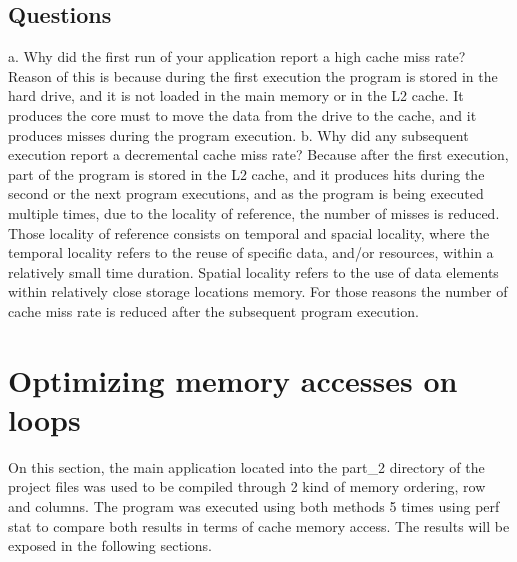 \documentclass[xcolor=table]{llncs}
\begin{document}
\subsection{Questions}
%
a. Why did the first run of your application report a high cache miss rate?\newline
Reason of this is because during the first execution the program is stored in the hard drive, and it is not loaded in the main memory or in the L2 cache.
It produces the core must to move the data from the drive to the cache, and it produces misses during the program execution.\newline\newline
b. Why did any subsequent execution report a decremental cache miss rate?\newline
Because after the first execution, part of the program is stored in the L2 cache, and it produces hits during the second or the next program executions, and as the program is being executed multiple times, due to the locality of reference, the number of misses is reduced.\newline
Those locality of reference consists on temporal and spacial locality, where the temporal locality refers to the reuse of specific data, and/or resources, within a relatively small time duration. Spatial locality refers to the use of data elements within relatively close storage locations memory.\newline
For those reasons the number of cache miss rate is reduced after the subsequent program execution.
\newline
%
\section{Optimizing memory accesses on loops}
%
On this section, the main application located into the part\_2 directory of the project files was used to be compiled through 2 kind of memory ordering, row and columns. 
The program was executed using both methods 5 times using perf stat to compare both results in terms of cache memory access. The results will be exposed in the following sections.\newline
\end{document}
